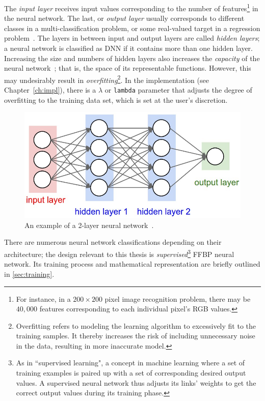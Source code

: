 The \textit{input layer} receives input values corresponding to the number of features\footnote{For instance, in a $200 \times 200$ pixel image recognition problem, there may be $40,000$ features corresponding to each individual pixel's RGB values.} in the neural network. The last, or \textit{output layer} usually corresponds to different classes in a multi-classification problem, or some real-valued target in a regression problem~\cite{Kar16}. The layers in between input and output layers are called \textit{hidden layers}; a neural network is classified as DNN if it contains more than one hidden layer. Increasing the size and numbers of hidden layers also increases the \textit{capacity} of the neural network~\cite{Kar16}; that is, the space of its representable functions. However, this may undesirably result in \textit{overfitting}\footnote{Overfitting refers to modeling the learning algorithm to excessively fit to the training samples. It thereby increases the risk of including unnecessary noise in the data, resulting in more inaccurate model.}. In the implementation (see Chapter~\ref{ch:impl}), there is a $\lambda$ or \texttt{lambda} parameter that adjusts the degree of overfitting to the training data set, which is set at the user's discretion.

\begin{figure}
  \centerline{\includegraphics[width=0.7\linewidth]{neural_net2.jpeg}}
  \caption{An example of a 2-layer neural network~\cite{Kar16}.}
  \label{fig:neural-network}
\end{figure}

There are numerous neural network classifications depending on their architecture; the design relevant to this thesis is \textit{supervised}\footnote{As in ``supervised learning", a concept in machine learning where a set of training examples is paired up with a set of corresponding desired output values. A supervised neural network thus adjusts its links' weights to get the correct output values during its training phase.} FFBP neural network. Its training process and mathematical representation are briefly outlined in \ref{sec:training}.

